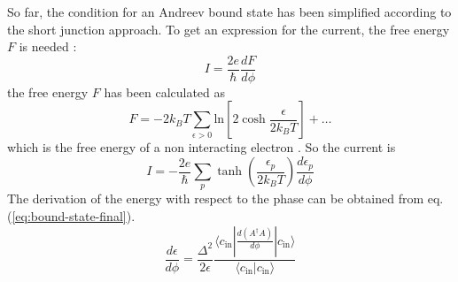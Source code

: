 So far, the condition for an Andreev bound state has been simplified according to the short junction approach. To get an expression for the current, the free energy $F$ is needed \cite{Beenakker1992}:
\begin{equation}
I = \frac{ 2 e}{\hbar} \frac{d F}{d \phi}
\end{equation}
the free energy $F$ has been calculated as \cite{Beenakker1991}
\begin{equation}
F = - 2 k_B T \sum_{\epsilon > 0 } \text{ln} \left[ 2 \cosh \frac{\epsilon}{2 k_B T}  \right] + \dots
\end{equation}
which is the free energy of a non interacting electron . 
So the current is
\begin{equation}
I = - \frac{2 e}{\hbar} \sum_p \tanh \left( \frac{\epsilon_p}{2 k_B T} \right) \frac{d \epsilon_p }{d \phi}
\end{equation}
The derivation of the energy with respect to the phase can be obtained from eq. (\ref{eq:bound-state-final}).
\begin{equation}
\frac{d \epsilon}{d \phi } = \frac{\Delta^2}{2 \epsilon} \frac{\langle c_\text{in} | \frac{d ( A^\dagger A )}{d \phi }| c_\text{in} \rangle} {\langle c_\text{in} |c_\text{in} \rangle}
\end{equation}



